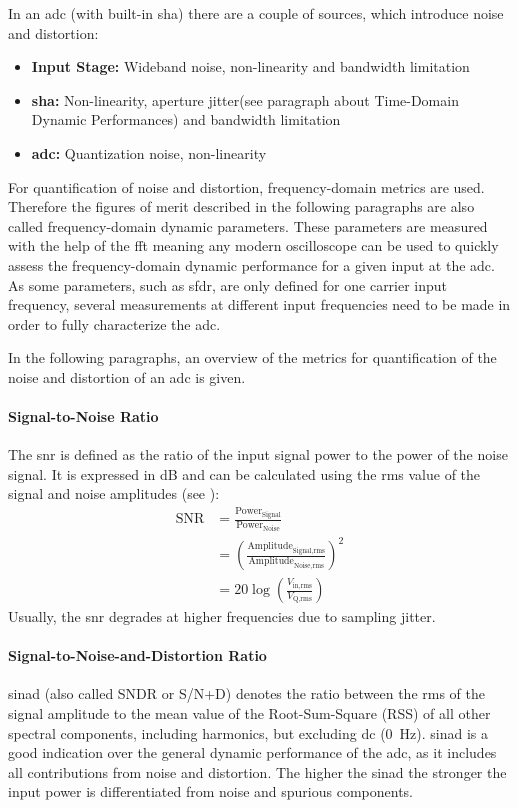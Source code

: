 In an \gls{adc} (with built-in \gls{sha}) there are a couple of sources, which introduce noise and distortion:
\begin{itemize}
	\item \textbf{Input Stage:} Wideband noise, non-linearity and bandwidth limitation
	\item \textbf{\gls{sha}:} Non-linearity, aperture jitter(see paragraph about Time-Domain Dynamic Performances) and bandwidth limitation %
	\item \textbf{\gls{adc}:} Quantization noise, non-linearity
\end{itemize}

For quantification of noise and distortion, frequency-domain metrics are used. 
Therefore the figures of merit described in the following paragraphs are also called frequency-domain dynamic parameters. 
These parameters are measured with the help of the \gls{fft} meaning any modern oscilloscope can be used to quickly assess the frequency-domain dynamic performance for a given input at the \gls{adc}.
As some parameters, such as \gls{sfdr}, are only defined for one carrier input frequency, several measurements at different input frequencies need to be made in order to fully characterize the \gls{adc}.

In the following paragraphs, an overview of the metrics for quantification of the noise and distortion of an \gls{adc} is given. 


\paragraph{Signal-to-Noise Ratio}
The \gls{snr} is defined as the ratio of the input signal power to the power of the noise signal. 
It is expressed in dB and can be calculated using the \gls{rms} value of the signal and noise amplitudes (see \cite{xilinx_adc}):
\begin{align}
	\text{SNR} &= \frac{\text{Power}_\text{Signal}}{\text{Power}_\text{Noise}}\\
	&= \left( \frac{\text{Amplitude}_\text{Signal,rms}}{\text{Amplitude}_\text{Noise,rms}} \right)^2\\
	&= 20 \log \left( \frac{V_\text{in,rms}}{V_\text{Q,rms}}\right) 
\end{align}
Usually, the \gls{snr} degrades at higher frequencies due to sampling jitter. \cite{xilinx_adc}

\paragraph{Signal-to-Noise-and-Distortion Ratio}
\gls{sinad} (also called SNDR or S/N+D) denotes the ratio between the \gls{rms} of the signal amplitude to the mean value of the Root-Sum-Square (RSS) of all other spectral components, including harmonics, but excluding \gls{dc} (\SI{0}{\hertz}). 
\gls{sinad} is a good indication over the general dynamic performance of the \gls{adc}, as it includes all contributions from noise and distortion.
The higher the \gls{sinad} the stronger the input power is differentiated from noise and spurious components. 

